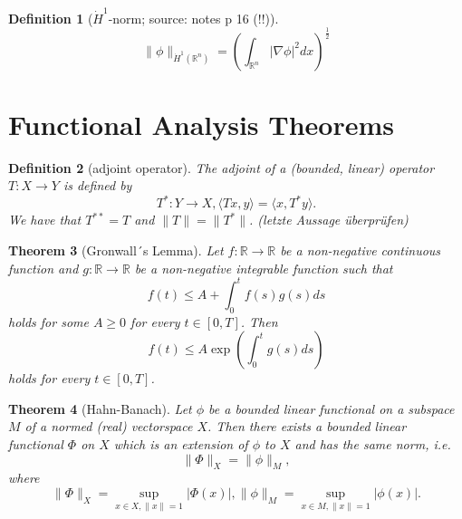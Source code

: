 \documentclass[12pt,a4paper]{article}
\newtheorem{definition}{Definition}
\newtheorem{thm}[definition]{Theorem}
\newcommand{\Rn}{\mathbb{R}^n}
\begin{document}
\begin{definition}[$\dot H^1$-norm; source: notes p 16 (!!)]
\begin{equation}
\lVert \phi \rVert_{\dot H^1(\Rn)} = (\int_{\Rn} \vert \nabla \phi \vert^2dx)^{\frac{1}{2}}
\end{equation}
\end{definition}

\section{Functional Analysis Theorems}

\begin{definition}[adjoint operator]
The adjoint of a (bounded, linear) operator $T:X\rightarrow Y$ is defined by
\begin{equation}
T^*:Y\rightarrow X, \langle Tx, y \rangle = \langle x, T^*y \rangle.
\end{equation}
We have that $T^{**}=T$ and $\lVert T \rVert = \lVert T^* \rVert$. (letzte Aussage überprüfen)
\end{definition}

\begin{thm}[Gronwall´s Lemma]
Let $f:\mathbb{R}\rightarrow\mathbb{R}$ be a non-negative continuous function and $g:\mathbb{R}\rightarrow\mathbb{R}$ be a  non-negative integrable function such that
\begin{equation}
f(t)\leq A+\int_0^tf(s)g(s)ds
\end{equation}
holds for some $A\geq 0$ for every $t\in[0,T]$. Then
\begin{equation}
f(t)\leq A\exp(\int_0^t g(s) ds)
\end{equation}
holds for every $t\in[0,T]$.
\end{thm}

\begin{thm}[Hahn-Banach]
Let $\phi$ be a bounded linear functional on a subspace $M$ of a normed (real) vectorspace $X$. Then there exists a bounded linear functional $\Phi$ on $X$ which is an extension of $\phi$ to $X$ and has the same norm, i.e.
\begin{equation}
\lVert\Phi\rVert_X=\lVert \phi \rVert_M,
\end{equation}
where
\begin{equation}
\lVert\Phi\rVert_X=\sup_{x\in X,\lVert x\rVert=1} \vert\Phi(x)\vert, 
\lVert \phi \rVert_M = \sup_{x\in M,\lVert x\rVert=1} \vert\phi(x)\vert.
\end{equation}
\end{thm}
\end{document}
